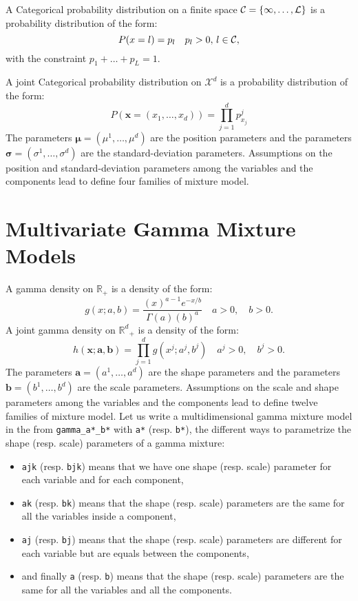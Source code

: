 \documentclass[a4paper,10pt]{article}
\newcommand{\R}{\mathbb{R}}
\newcommand{\Rd}{{\mathbb{R}^d}}
\newcommand{\Xd}{{\mathcal{X}^d}}
\newcommand{\ba}{\mathbf{a}}
\newcommand{\bb}{\mathbf{b}}
\newcommand{\bx}{\mathbf{x}}
\newcommand{\bsigma}{\boldsymbol{\sigma}}
\newcommand{\bmu}{\boldsymbol{\mu}}
\begin{document}
A Categorical probability distribution on a finite space $\cal C = \{1,\ldots,L\}$ is a probability distribution of the form:
\begin{equation}\label{law::categorical}
P(x=l) = p_l \quad p_l>0,\, l\in \cal C,
\end{equation}
with the constraint $p_1+\ldots+p_L = 1.$

A joint Categorical probability distribution on $\Xd$ is a probability distribution of the form:
\begin{equation}\label{law::joint-categorical-probability}
P(\bx=(x_1,\ldots,x_d)) = \prod_{j=1}^d p^j_{x_j}
\end{equation}
The parameters $\bmu=(\mu^1,\ldots,\mu^d)$ are the position parameters and the parameters $\bsigma=(\sigma^1,\ldots,\sigma^d)$
are the standard-deviation parameters. Assumptions on the position and standard-deviation parameters among the variables and the components
lead to define four families of mixture model.


\section{Multivariate Gamma Mixture Models}

A gamma density on $\R_+$ is a density of the form:
\begin{equation}\label{law::gamma-density}
g(x;a,b) = \frac{ \left(x\right)^{a-1} e^{-x/b}}{\Gamma(a) \left(b\right)^{a}} \quad a>0, \quad b>0.
\end{equation}
A joint gamma density on $\Rd_+$ is a density of the form:
\begin{equation}\label{law::joint-gamma-density}
h(\bx;\ba,\bb) = \prod_{j=1}^d g(x^j;a^j,b^j) \quad a^j>0, \quad b^j>0.
\end{equation}
The parameters $\ba=(a^1,\ldots,a^d)$ are the shape parameters and the parameters $\bb=(b^1,\ldots,b^d)$ are the
scale parameters. Assumptions on the scale and shape parameters among the variables and the components
lead to define twelve families of mixture model. Let us write a multidimensional gamma mixture model in the from \verb+gamma_a*_b*+
with \verb+a*+ (resp. \verb+b*+), the different ways to parametrize the shape (resp. scale) parameters of a gamma mixture:
\begin{itemize}
\item \verb+ajk+ (resp. \verb+bjk+) means that we have one shape (resp. scale) parameter for each variable and for each component,
\item \verb+ak+ (resp. \verb+bk+) means that the shape (resp. scale) parameters are the same for all the variables inside a component,
\item \verb+aj+ (resp. \verb+bj+) means that the shape (resp. scale) parameters are different for each variable but are equals between the components,
\item and finally \verb+a+ (resp. \verb+b+) means that the shape (resp. scale) parameters are the same for all the variables and all the components.
\end{itemize}
\end{document}
